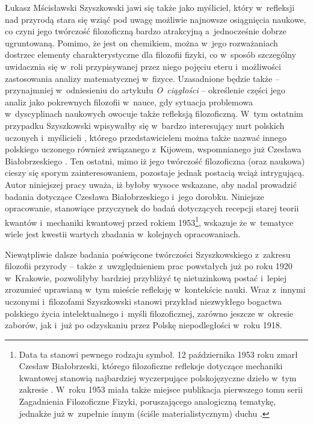 \begin{artplenv}{Łukasz Mścisławski}
Szyszkowski jawi się także jako myśliciel, który w~refleksji nad przyrodą stara się wziąć pod uwagę możliwie najnowsze osiągnięcia naukowe, co czyni jego twórczość filozoficzną bardzo atrakcyjną a~jednocześnie dobrze ugruntowaną. Pomimo, że jest on chemikiem, można w~jego rozważaniach dostrzec elementy charakterystyczne dla filozofii fizyki, co w~sposób szczególny uwidacznia się w~roli przypisywanej przez niego pojęciu eteru i~możliwości zastosowania analizy matematycznej w~fizyce. Uzasadnione będzie także -- przynajmniej w~odniesieniu do artykułu \textit{O~ciągłości} -- określenie części jego analiz jako pokrewnych filozofii w~nauce, gdy sytuacja problemowa w~dyscyplinach naukowych owocuje także refleksją filozoficzną. W~tym ostatnim przypadku Szyszkowski wpisywałby się w~bardzo interesujący nurt polskich uczonych i~myślicieli
\parencite[zob. np.][]{polak_philosophy_2019}, %
 którego przedstawicielem można także nazwać innego polskiego uczonego również związanego z~Kijowem, wspomnianego już Czesława Białobrzeskiego 
\parencite[zob. np.][]{mscislawski_miedzy_2017}. %
 Ten ostatni, mimo iż jego twórczość filozoficzna (oraz naukowa) cieszy się sporym zainteresowaniem, pozostaje jednak postacią wciąż intrygującą. Autor niniejszej pracy uważa, iż byłoby wysoce wskazane, aby nadal prowadzić badania dotyczące Czesława Białobrzeskiego i~jego dorobku. Niniejsze opracowanie, stanowiące przyczynek do badań dotyczących recepcji starej teorii kwantów i~mechaniki kwantowej przed rokiem 1953\footnote{Data ta stanowi pewnego rodzaju symbol. 12 października 1953 roku zmarł Czesław Białobrzeski, którego filozoficzne refleksje dotyczące mechaniki kwantowej stanowią najbardziej wyczerpujące polskojęzyczne dzieło w~tym zakresie 
\parencite[][]{bialobrzeski_podstawy_1984}. %
 W~roku 1953 miała także miejsce publikacja pierwszego tomu serii Zagadnienia Filozoficzne Fizyki, poruszającego analogiczną tematykę, jednakże już w~zupełnie innym (ściśle materialistycznym) duchu 
\parencite[][]{aleksandrow_zagadnienia_1953}.%
}, wskazuje że w~tematyce wiele jest kwestii wartych zbadania w~kolejnych opracowaniach.

Niewątpliwie dalsze badania poświęcone twórczości Szyszkowskiego z~zakresu filozofii przyrody -- także z~uwzględnieniem prac powstałych już po roku 1920 w~Krakowie, pozwoliłyby bardziej przybliżyć tę nietuzinkową postać i~lepiej zrozumieć uprawianą w~tym mieście refleksję w~kontekście nauki. Wraz z~innymi uczonymi i~filozofami Szyszkowski stanowi przykład niezwykłego bogactwa polskiego życia intelektualnego i~myśli filozoficznej, zarówno jeszcze w~okresie zaborów, jak i~już po odzyskaniu przez Polskę niepodległości w~roku 1918.

\end{artplenv}